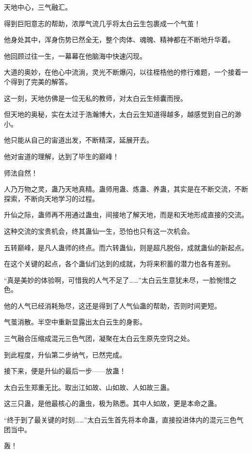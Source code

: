 
\begin{this_body}

天地中心，三气融汇。

得到巨阳意志的帮助，浓厚气流几乎将太白云生包裹成一个气茧！

他身处其中，浑身伤势已然全无，整个肉体、魂魄、精神都在不断地升华着。

他回顾过往一生，一幕幕在他脑海中快速闪现。

大道的奥妙，在他心中流淌，灵光不断爆闪，以往桎梏他的修行难题，一个接着一个得到了完美的解答。

这一刻，天地仿佛是一位无私的教师，对太白云生倾囊而授。

但天地的奥秘，实在太过于浩瀚博大，太白云生知道得越多，越感觉到自己的渺小。

他只能从自己的宙道出发，不断精深，延展开去。

他对宙道的理解，达到了毕生的巅峰！

师法自然！

人乃万物之灵，蛊乃天地真精。蛊师用蛊、炼蛊、养蛊，其实是在不断交流，不断探索，不断向天地学习的过程。

升仙之际，蛊师再不用通过蛊虫，间接地了解天地，而是和天地形成直接的交流。

这种交流的宝贵机会，终其蛊仙一生，恐怕也只有这一次机会。

五转巅峰，是凡人蛊师的终点。而六转蛊仙，则是超凡脱俗，成就蛊仙的新起点。

在这个关键的起点，各个蛊仙们达到的成就，为将来积蓄的潜力也各有差别。

“真是美妙的体验啊，可惜我的人气不足了……”太白云生意犹未尽，一脸惋惜之色。

他的人气已经消耗殆尽，这还是得到了人气仙蛊的帮助，否则时间更短。

气茧消散。半空中重新显露出太白云生的身影。

三气融合压缩成混元三色气团，凝聚在太白云生原先空窍之处。

到此程度，升仙第二步纳气，已然完成。

接下来，便是升仙的最后一步——放蛊！

太白云生郑重无比。取出江如故、山如故、人如故三蛊。

这三只蛊，是他最核心的蛊虫，极为熟悉。其中人如故，更是本命之蛊。

“终于到了最关键的时刻……”太白云生首先将本命蛊，直接投进体内的混元三色气团当中。

轰！


\end{this_body}

